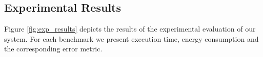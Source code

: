 \begin{comment}
\subsection{Evaluation conclusions}
Our runtime behaves comparatively close to OpenMP\cite{openmp4_2013}. When BDDT is instructed to execute the benchmarks 100\% accurate it marginally fails short at delivering the same time and energy performance by <I think this is  I need to check this out >. We note that the benchmarks demonstrate the following two trends:
\begin{enumerate}
\item The energy-benefits of the approximation seem to maximize when the processing cores are set on high frequency.
\item The approximation speedup gain deteriorates as the number of parallel threads increases.
\end{enumerate}
We could elaborate on both observations. For the second one we can present data where we increase the number of tasks. As the number of tasks increase the granularity of significance is finer however the overhead would be immense therefore the programmer should create tasks with the performance as first constraint and as a second the significance.

\end{comment}

\subsection{Experimental Results}

Figure \ref{fig:exp_results} depicts the results of the experimental evaluation of our system.  For each benchmark we present execution time, energy consumption and the corresponding error metric. 

